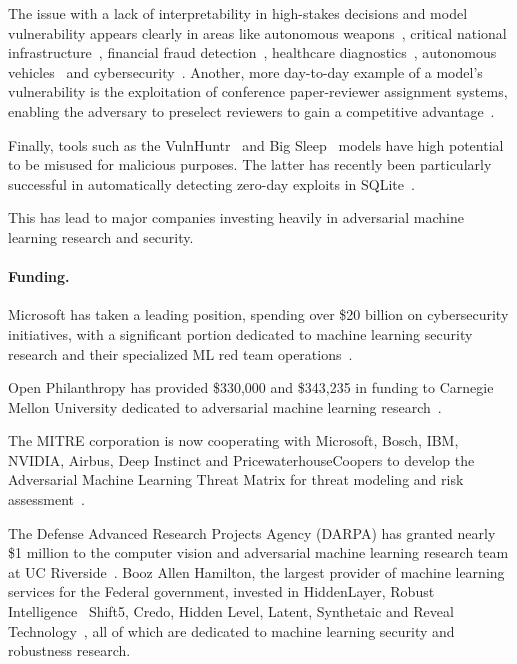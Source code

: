 \documentclass[a4paper, oneside]{discothesis}
\begin{document}
The issue with a lack of interpretability in high-stakes decisions and model vulnerability appears clearly in areas like autonomous weapons~\cite{Miller2017ComputerVO}, critical national infrastructure~\cite{Moradpoor2023TheTO, Chevardin2023AnalysisOA, Ulybyshev2021TrustworthyDA, Halak2022TowardsAP, Rudolph2008DevelopingPS}, financial fraud detection~\cite{Gu2022DeepLT, Agarwal2021BlackBoxAE, Tsai2024EffectiveAE}, healthcare diagnostics~\cite{jogani2022analysis, najafi2024dft, 9154468}, autonomous vehicles~\cite{Patel2019AdaptiveAV, Ji2021PoltergeistAA, Axelrod2017CybersecurityCO} and cybersecurity~\cite{Yuan2023MultiSpacePhishET, to2023effectiveness, eisenhofer2023no}. Another, more day-to-day example of a model's vulnerability is the exploitation of conference paper-reviewer assignment systems, enabling the adversary to preselect reviewers to gain a competitive advantage~\cite{eisenhofer2023no}.

Finally, tools such as the VulnHuntr~\cite{vulnhuntr} and Big Sleep~\cite{bigsleep2024} models have high potential to be misused for malicious purposes. The latter has recently been particularly successful in automatically detecting zero-day exploits in SQLite~\cite{bigsleep2024}.

This has lead to major companies investing heavily in adversarial machine learning research and security.

\paragraph{Funding.}

Microsoft has taken a leading position, spending over \$20 billion on cybersecurity initiatives, with a significant portion dedicated to machine learning security research and their specialized ML red team operations~\cite{coursera_adversarial_2024}.

Open Philanthropy has provided \$330,000 and \$343,235 in funding to Carnegie Mellon University dedicated to adversarial machine learning research~\cite{openphil2024adversarial}.

The MITRE corporation is now cooperating with Microsoft, Bosch, IBM, NVIDIA, Airbus, Deep Instinct and PricewaterhouseCoopers to develop the Adversarial Machine Learning Threat Matrix for threat modeling and risk assessment~\cite{mitre2024ml}.

The Defense Advanced Research Projects Agency (DARPA) has granted nearly \$1 million to the computer vision and adversarial machine learning research team at UC Riverside~\cite{roy2020darpa}.
Booz Allen Hamilton, the largest provider of machine learning services for the Federal government, invested in HiddenLayer, Robust Intelligence~\cite{robustintelligence2024, cai2020robust} Shift5, Credo, Hidden Level, Latent, Synthetaic and Reveal Technology~\cite{boozallen2023adversarial, boozallen2023adversarialother}, all of which are dedicated to machine learning security and robustness research.
\end{document}
